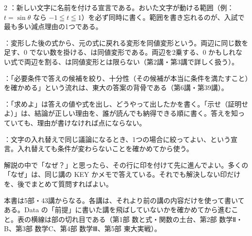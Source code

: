 \documentclass[paper=b5j, fontsize=8pt, fleqn, twoside]{jlreq}
\begin{document}
\begin{multicols*}{2}
  ：新しい文字に名前を付ける宣言である。おいた文字が動ける範囲（例：$t=\sin\theta$ なら $-1\leqq t\leqq 1$）を必ず同時に書く。範囲を書き忘れるのが、入試で最も多い減点理由の1つである。

  ：変形した後の式から、元の式に戻れる変形を同値変形という。両辺に同じ数を足す、$0$ でない数を掛ける、は同値変形である。両辺を2乗する、$0$ かもしれない式で両辺を割る、は同値変形とは限らない（第2講・第3講で詳しく扱う）。

  ：「必要条件で答えの候補を絞り、十分性（その候補が本当に条件を満たすこと）を確かめる」という流れは、東大の答案の背骨である（第6講・第39講）。

  ：「求めよ」は答えの値や式を出し、どうやって出したかを書く。「示せ（証明せよ）」は、結論が正しい理由を、誰が読んでも納得できる順に書く。答えを知っていても、理由が書けなければ点にならない。

  ：文字の入れ替えで同じ議論になるとき、1つの場合に絞ってよい、という宣言。入れ替えても条件が変わらないことを確かめてから使う。

  \begin{memo}
    解説の中で「なぜ？」と思ったら、その行に印を付けて先に進んでよい。多くの「なぜ」は、同じ講の KEY かメモで答えている。それでも解決しない印だけを、後でまとめて質問すればよい。
  \end{memo}

  \notefill
\end{multicols*}

\clearpage
{}

本書は5部・43講からなる。各講は、それより前の講の内容だけを使って書いてある。Data の「前提」に書いた講を飛ばしていないかを確かめてから進むこと。表の横線は部の切れ目である（第1部 数と式・関数の土台、第2部 数学Ⅱ・B、第3部 数学C、第4部 数学Ⅲ、第5部 東大実戦）。
\end{document}
